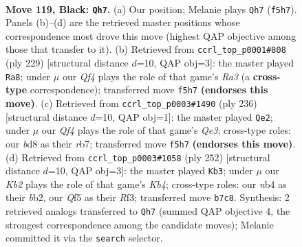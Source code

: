 \documentclass[11pt]{article}
\begin{document}
\clearpage

\begin{figure}[p]\centering
\begin{subfigure}{0.46\textwidth}\centering
\resizebox{\linewidth}{!}{%
\newchessgame
\chessboard[
  setfen={3B4/1k6/8/5q2/1N6/K7/8/8 b - - 7 119},
  showmover=false,
  pgfstyle=straightmove, color=movearrow, markmove={f5-h7}
]}
\caption{}
\end{subfigure}\hfill
\begin{subfigure}{0.46\textwidth}\centering
\resizebox{\linewidth}{!}{%
\newchessgame
\chessboard[
  setfen={8/8/r7/2NK1B2/8/5n2/1k6/8 b - - 69 115},
  showmover=false,
  pgfstyle=straightmove, color=movearrow, markmove={a6-a8}
]}
\caption{}
\end{subfigure}
\\[4pt]
\begin{subfigure}{0.46\textwidth}\centering
\resizebox{\linewidth}{!}{%
\newchessgame
\chessboard[
  setfen={8/1r6/3K4/8/k7/4Q3/8/8 w - - 13 119},
  showmover=false,
  pgfstyle=straightmove, color=movearrow, markmove={e3-e2}
]}
\caption{}
\end{subfigure}\hfill
\begin{subfigure}{0.46\textwidth}\centering
\resizebox{\linewidth}{!}{%
\newchessgame
\chessboard[
  setfen={6B1/8/8/8/1K4n1/5R2/1b6/1k6 w - - 93 127},
  showmover=false,
  pgfstyle=straightmove, color=movearrow, markmove={b4-b3}
]}
\caption{}
\end{subfigure}
\caption{\textbf{Move 119, Black: \texttt{Qh7}.} (a) Our position; Melanie plays \texttt{Qh7} (\texttt{f5h7}). Panels (b)--(d) are the retrieved master positions whose correspondence most drove this move (highest QAP objective among those that transfer to it). (b) Retrieved from \texttt{ccrl\_top\_p0001\#808} (ply 229) [structural distance $d$=10, QAP obj=3]: the master played \texttt{Ra8}; under $\mu$ our \emph{Qf4} plays the role of that game's \emph{Ra3} (a \textbf{cross-type} correspondence); transferred move \texttt{f5h7} \textbf{(endorses this move)}. (c) Retrieved from \texttt{ccrl\_top\_p0003\#1490} (ply 236) [structural distance $d$=10, QAP obj=1]: the master played \texttt{Qe2}; under $\mu$ our \emph{Qf4} plays the role of that game's \emph{Qe3}; cross-type roles: our \emph{b}d8 as their \emph{r}b7; transferred move \texttt{f5h7} \textbf{(endorses this move)}. (d) Retrieved from \texttt{ccrl\_top\_p0003\#1058} (ply 252) [structural distance $d$=10, QAP obj=3]: the master played \texttt{Kb3}; under $\mu$ our \emph{Kb2} plays the role of that game's \emph{Kb4}; cross-type roles: our \emph{n}b4 as their \emph{b}b2, our \emph{Q}f5 as their \emph{R}f3; transferred move \texttt{b7c8}. Synthesis: 2 retrieved analogs transferred to \texttt{Qh7} (summed QAP objective 4, the strongest correspondence among the candidate moves); Melanie committed it via the \texttt{search} selector.}
\label{fig:thought-m237}
\end{figure}
\end{document}
